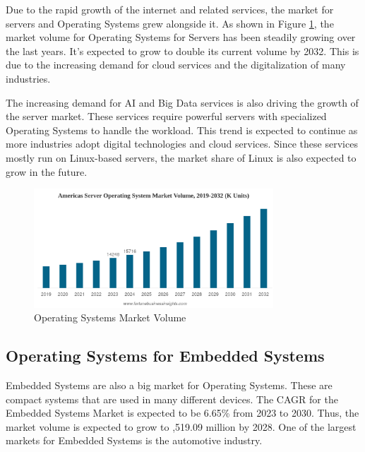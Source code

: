 Due to the rapid growth of the internet and related services, the market for servers and Operating Systems grew alongside it. 
As shown in Figure \ref{fig:Operating_System_Market_Volume}, the market volume for Operating Systems for Servers has been steadily growing over the last years.
It's expected to grow to double its current volume by 2032. This is due to the increasing demand for cloud services and the digitalization of many industries.

The increasing demand for AI and Big Data services is also driving the growth of the server market. These services require powerful servers with specialized Operating Systems to handle the workload.
This trend is expected to continue as more industries adopt digital technologies and cloud services. Since these services mostly run on Linux-based servers, the market share of Linux is also expected to grow in the future.

\begin{figure}[H]
    \centering
    \includegraphics[width=0.8\textwidth]{figures/Server-Market-Volume.png}
    \caption{Operating Systems Market Volume}
    \label{fig:Operating_System_Market_Volume}
\end{figure}

\cite{ServerOsMarketShare2}


\subsection{Operating Systems for Embedded Systems}

Embedded Systems are also a big market for Operating Systems. These are compact systems that are used in many different devices.
The CAGR for the Embedded Systems Market is expected to be 6.65\% from 2023 to 2030. Thus, the market volume is expected to grow to ,519.09 million by 2028.
One of the largest markets for Embedded Systems is the automotive industry. 

\cite{EmbeddedOsMarketShare}

